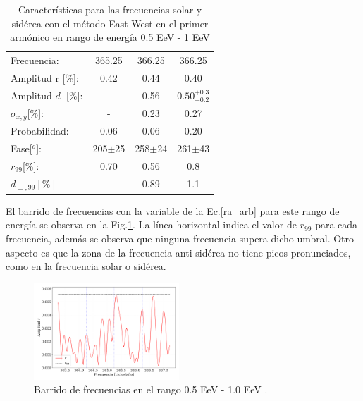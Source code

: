 \begin{table}[H]
        \begin{small}
            \begin{center}
                \begin{tabular}[c]{l|c||c|c}
                    Frecuencia:             & 365.25	    & 366.25		& 366.25\cite{Aab_2020}\\
                    Amplitud r [\%]:        & 0.42          & 0.44	        & 0.40\footnotemark[2] \\
                    Amplitud $d_\perp$[\%]: & -             & 0.56          & $0.50^{+0.3}_{-0.2}$\\
                    $\sigma_{x,y}$[\%]:     & -	            & 0.23	        & 0.27       \\
                    Probabilidad:           & 0.06          & 0.06	        & 0.20\\
                    Fase[$^o$]:             & 205$\pm$25	& 258$\pm$24	& 261$\pm$43\footnotemark[3]  \\
                    $r_{99}$[\%]:           & 0.70	        & 0.56          & 0.8\footnotemark[2] \\
                    $d_{\perp,99}[\%]$      & -             & 0.89          & 1.1\\
                \end{tabular}
            \end{center}
        \end{small}
        \caption{Características para las frecuencias solar y sidérea con el método East-West en el primer armónico en rango de energía 0.5 EeV - 1 EeV}
        \label{tab:solar}
    \end{table}

    El barrido de frecuencias con la variable de la Ec.\ref{ra_arb} para este rango de energía se observa en la Fig.\ref{fig:segundo_barrido}. La línea horizontal indica el valor de $r_{99}$ para cada frecuencia, además se observa que ninguna frecuencia supera dicho umbral. Otro aspecto es que la zona de la frecuencia anti-sidérea no tiene picos pronunciados, como en la frecuencia solar o sidérea.

    \begin{figure}[H]
        \begin{small}
            \begin{center}
                \includegraphics[width=0.485\textwidth]{plot_bin_2_barrido_v2.pdf}
            \end{center}
            \caption{Barrido de frecuencias en el  rango 0.5 EeV - 1.0 EeV .}
            \label{fig:segundo_barrido}
        \end{small}
    \end{figure}    


